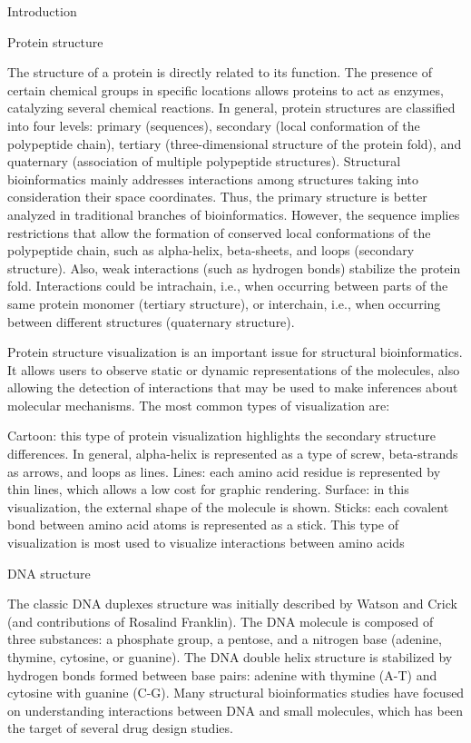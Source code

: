 Introduction

Protein structure

The structure of a protein is directly related to its function. The presence of certain chemical groups in specific locations allows proteins to act as enzymes, catalyzing several chemical reactions. In general, protein structures are classified into four levels: primary (sequences), secondary (local conformation of the polypeptide chain), tertiary (three-dimensional structure of the protein fold), and quaternary (association of multiple polypeptide structures). Structural bioinformatics mainly addresses interactions among structures taking into consideration their space coordinates. Thus, the primary structure is better analyzed in traditional branches of bioinformatics. However, the sequence implies restrictions that allow the formation of conserved local conformations of the polypeptide chain, such as alpha-helix, beta-sheets, and loops (secondary structure). Also, weak interactions (such as hydrogen bonds) stabilize the protein fold. Interactions could be intrachain, i.e., when occurring between parts of the same protein monomer (tertiary structure), or interchain, i.e., when occurring between different structures (quaternary structure).

Protein structure visualization is an important issue for structural bioinformatics. It allows users to observe static or dynamic representations of the molecules, also allowing the detection of interactions that may be used to make inferences about molecular mechanisms. The most common types of visualization are:

Cartoon: this type of protein visualization highlights the secondary structure differences. In general, alpha-helix is represented as a type of screw, beta-strands as arrows, and loops as lines.
Lines: each amino acid residue is represented by thin lines, which allows a low cost for graphic rendering.
Surface: in this visualization, the external shape of the molecule is shown.
Sticks: each covalent bond between amino acid atoms is represented as a stick. This type of visualization is most used to visualize interactions between amino acids

DNA structure

The classic DNA duplexes structure was initially described by Watson and Crick (and contributions of Rosalind Franklin). The DNA molecule is composed of three substances: a phosphate group, a pentose, and a nitrogen base (adenine, thymine, cytosine, or guanine). The DNA double helix structure is stabilized by hydrogen bonds formed between base pairs: adenine with thymine (A-T) and cytosine with guanine (C-G). Many structural bioinformatics studies have focused on understanding interactions between DNA and small molecules, which has been the target of several drug design studies.


